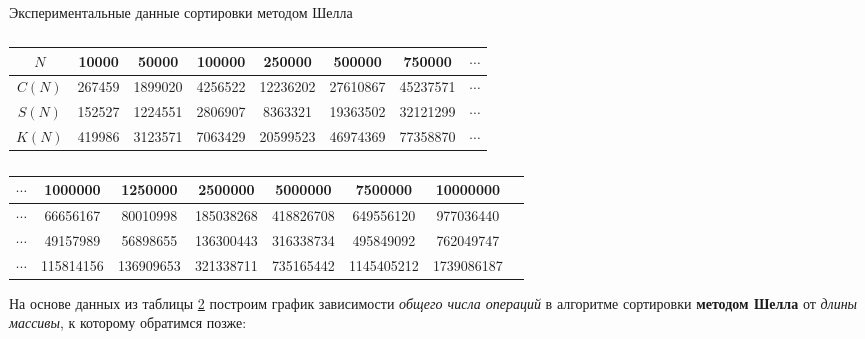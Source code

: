 \documentclass[a4paper,12pt,titlepage,finall]{article}
\begin{document}
\begin{table}[h]
\centering
\caption{Экспериментальные данные сортировки методом Шелла}
\begin{tabular}{|c|c|c|c|c|c|c|c|}
    \hline
     $N$ & 10000 & 50000 & 100000 & 250000 & 500000 & 750000 & $\cdots$ \\
    \hline
     $C(N)$ & 267459 & 1899020 & 4256522  & 12236202 & 27610867 & 45237571 & $\cdots$ \\
    \hline
    $S(N)$ & 152527 & 1224551 & 2806907  & 8363321 & 19363502 & 32121299 & $\cdots$ \\
    \hline
    $K(N)$ & 419986 & 3123571 & 7063429  & 20599523 & 46974369 & 77358870 & $\cdots$ \\
    \hline
\end{tabular}
\caption*{}
\begin{tabular}{|c|c|c|c|c|c|c|c|}
    \hline
    $\cdots$ & 1000000 & 1250000 & 2500000 & 5000000 & 7500000 & 10000000\\
    \hline
     $\cdots$ & 66656167 & 80010998 & 185038268  & 418826708 & 649556120 & 977036440 \\
    \hline
    $\cdots$ & 49157989 & 56898655 & 136300443  & 316338734 & 495849092 & 762049747 \\
    \hline
    $\cdots$ & 115814156 & 136909653 & 321338711  & 735165442 & 1145405212 & 1739086187 \\
    \hline
\end{tabular}
\label{shell_table_approximation}
\end{table}

На основе данных из таблицы \ref{shell_table_approximation} построим график зависимости \textit{общего числа операций} в алгоритме сортировки \textbf{методом Шелла} от \textit{длины массивы}, к которому обратимся позже:\\

\end{document}
